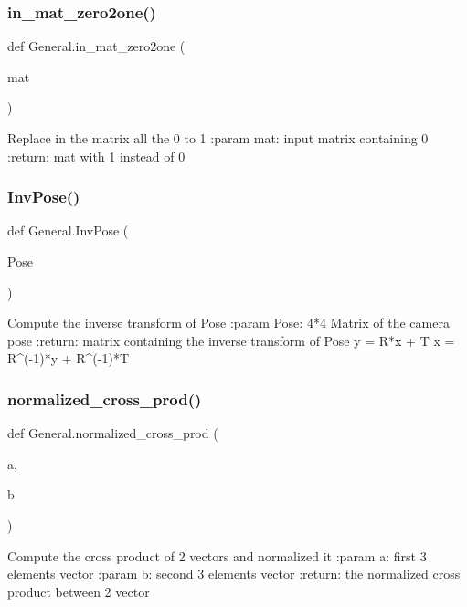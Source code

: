 \subsubsection{in\+\_\+mat\+\_\+zero2one()}
{\footnotesize\ttfamily def General.\+in\+\_\+mat\+\_\+zero2one (\begin{DoxyParamCaption}\item[{}]{mat }\end{DoxyParamCaption})}

\begin{DoxyVerb}Replace in the matrix all the 0 to 1
:param mat: input matrix containing 0
:return:  mat with 1 instead of 0
\end{DoxyVerb}
 \mbox{\label{namespace_general_a7fb8753b34ce7bd6133dda90add3aa73}} 
\subsubsection{Inv\+Pose()}
{\footnotesize\ttfamily def General.\+Inv\+Pose (\begin{DoxyParamCaption}\item[{}]{Pose }\end{DoxyParamCaption})}

\begin{DoxyVerb}Compute the inverse transform of Pose
:param Pose: 4*4 Matrix of the camera pose
:return: matrix containing the inverse transform of Pose
y = R*x + T
x = R^(-1)*y + R^(-1)*T
\end{DoxyVerb}
 \mbox{\label{namespace_general_aafcc697815eaa5f02073a65381657756}} 
\subsubsection{normalized\+\_\+cross\+\_\+prod()}
{\footnotesize\ttfamily def General.\+normalized\+\_\+cross\+\_\+prod (\begin{DoxyParamCaption}\item[{}]{a,  }\item[{}]{b }\end{DoxyParamCaption})}

\begin{DoxyVerb}Compute the cross product of 2 vectors and normalized it
:param a: first 3 elements vector
:param b: second 3 elements vector
:return: the normalized cross product between 2 vector
\end{DoxyVerb}
 \mbox{\label{namespace_general_adfadd7bf376e5e61f7ff3814f92dea05}} 
